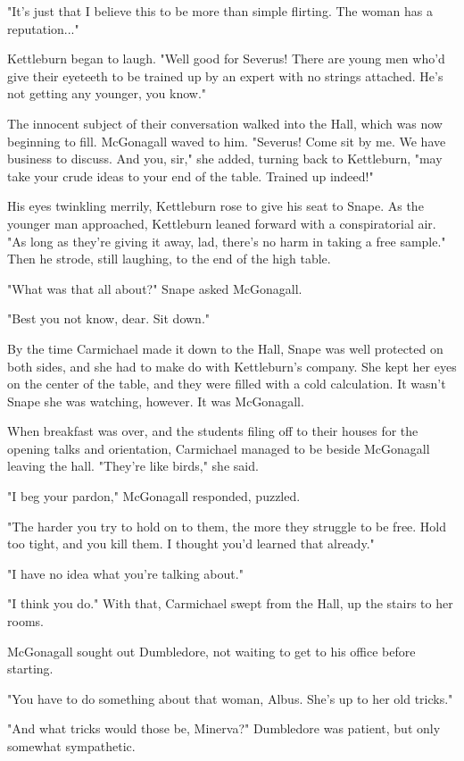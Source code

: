 "It's just that I believe this to be more than simple flirting. The woman has a reputation..."

Kettleburn began to laugh. "Well good for Severus! There are young men who'd give their eyeteeth to be trained up by an expert with no strings attached. He's not getting any younger, you know."

The innocent subject of their conversation walked into the Hall, which was now beginning to fill. McGonagall waved to him. "Severus! Come sit by me. We have business to discuss. And you, sir," she added, turning back to Kettleburn, "may take your crude ideas to your end of the table. Trained up indeed!"

His eyes twinkling merrily, Kettleburn rose to give his seat to Snape. As the younger man approached, Kettleburn leaned forward with a conspiratorial air. "As long as they're giving it away, lad, there's no harm in taking a free sample." Then he strode, still laughing, to the end of the high table.

"What was that all about?" Snape asked McGonagall.

"Best you not know, dear. Sit down."

By the time Carmichael made it down to the Hall, Snape was well protected on both sides, and she had to make do with Kettleburn's company. She kept her eyes on the center of the table, and they were filled with a cold calculation. It wasn't Snape she was watching, however. It was McGonagall.

When breakfast was over, and the students filing off to their houses for the opening talks and orientation, Carmichael managed to be beside McGonagall leaving the hall. "They're like birds," she said.

"I beg your pardon," McGonagall responded, puzzled.

"The harder you try to hold on to them, the more they struggle to be free. Hold too tight, and you kill them. I thought you'd learned that already."

"I have no idea what you're talking about."

"I think you do." With that, Carmichael swept from the Hall, up the stairs to her rooms.

McGonagall sought out Dumbledore, not waiting to get to his office before starting.

"You have to do something about that woman, Albus. She's up to her old tricks."

"And what tricks would those be, Minerva?" Dumbledore was patient, but only somewhat sympathetic.

